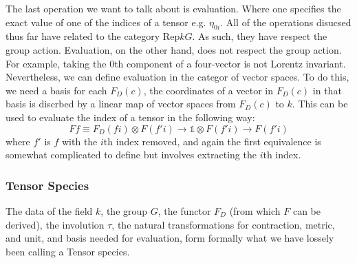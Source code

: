 \documentclass[a4paper, 11pt]{article}
\begin{document}
The last operation we want to talk about is evaluation. Where one specifies the exact value of 
one of the indices of a tensor e.g. $\eta_{0i}$. 
All of the operations disucsed thus far have related to the category $\mathrm{Rep} k G$. As such, 
they have respect the group action. Evaluation, on the other hand, does not respect the group action. 
For example, taking the $0$th component of a four-vector is not Lorentz invariant. 
Nevertheless, we can define evaluation in the categor of vector spaces. 
To do this, we need a basis for each $F_D(c)$, the coordinates of a vector in $F_D(c)$ in that basis 
is discrbed by a linear map of vector spaces from $F_D(c)$ to $k$. This can be used 
to evaluate the index of a tensor in the following way: 
\begin{equation} 
  F f \equiv F_D (f i) \otimes F (f' i) \to \mathbb{1} \otimes F (f' i) \to F (f' i)
\end{equation}
where $f'$ is $f$ with the $i$th index removed, and again the first equivalence is somewhat
complicated to define but involves extracting the $i$th index.

\subsubsection{Tensor Species}

The data of the field $k$, the group $G$, the functor $F_D$ (from which $F$ can be derived), the involution $\tau$, the natural
transformations for contraction, metric, and unit, and basis needed for evaluation, 
form formally what we have lossely been calling a Tensor species.
\end{document}
